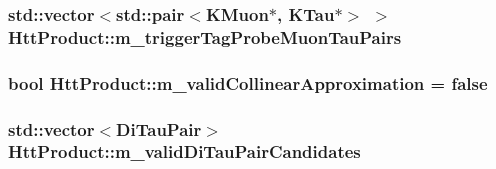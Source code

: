 \label{classHttProduct_a14ce939d448152c742021f043fc8922b}
\hypertarget{classHttProduct_a7b64fed593836a716e0549e4e3e593aa}{
\subsubsection[{m\_\-triggerTagProbeMuonTauPairs}]{\setlength{\rightskip}{0pt plus 5cm}std::vector$<$std::pair$<$KMuon$\ast$, KTau$\ast$$>$ $>$ {\bf HttProduct::m\_\-triggerTagProbeMuonTauPairs}}}
\label{classHttProduct_a7b64fed593836a716e0549e4e3e593aa}
\hypertarget{classHttProduct_a02e57a61e9244518c03d5b61798b5bfa}{
\subsubsection[{m\_\-validCollinearApproximation}]{\setlength{\rightskip}{0pt plus 5cm}bool {\bf HttProduct::m\_\-validCollinearApproximation} = false}}
\label{classHttProduct_a02e57a61e9244518c03d5b61798b5bfa}
\hypertarget{classHttProduct_af59b7e6a1ea36e0e84b34d9bfbda2484}{
\subsubsection[{m\_\-validDiTauPairCandidates}]{\setlength{\rightskip}{0pt plus 5cm}std::vector$<${\bf DiTauPair}$>$ {\bf HttProduct::m\_\-validDiTauPairCandidates}}}
\label{classHttProduct_af59b7e6a1ea36e0e84b34d9bfbda2484}


